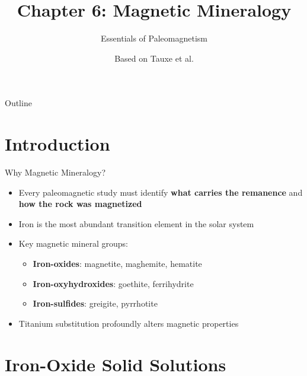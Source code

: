 \documentclass[aspectratio=169,11pt]{beamer}
\title[Ch.~6: Magnetic Mineralogy]{Chapter 6: Magnetic Mineralogy}
\subtitle{Essentials of Paleomagnetism}
\author{Based on Tauxe et al.}
\date{}
\begin{document}
\begin{frame}
\titlepage
\end{frame}

\begin{frame}{Outline}
\tableofcontents
\end{frame}

\section{Introduction}

\begin{frame}{Why Magnetic Mineralogy?}

\begin{itemize}
  \item Every paleomagnetic study must identify \textbf{what carries the remanence} and \textbf{how the rock was magnetized}
  \item Iron is the most abundant transition element in the solar system
  \item Key magnetic mineral groups:
  \begin{itemize}
    \item \textbf{Iron-oxides}: magnetite, maghemite, hematite
    \item \textbf{Iron-oxyhydroxides}: goethite, ferrihydrite
    \item \textbf{Iron-sulfides}: greigite, pyrrhotite
  \end{itemize}
  \item Titanium substitution profoundly alters magnetic properties
\end{itemize}

\end{frame}

\section{Iron-Oxide Solid Solutions}
\end{document}
